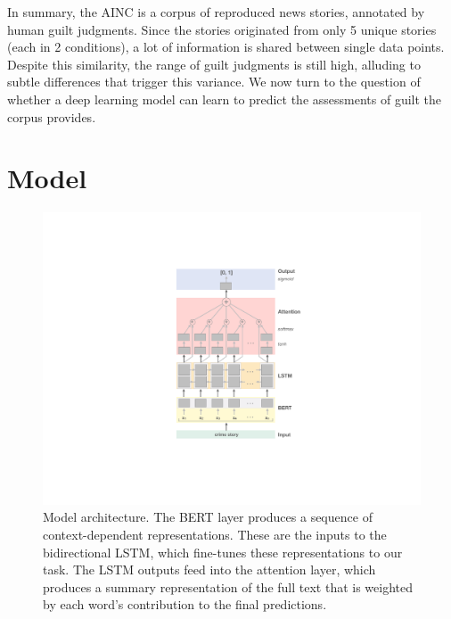 \documentclass[11pt,a4paper]{article}
\begin{document}
In summary, the AINC is a corpus of reproduced news stories, annotated by human guilt judgments. Since the stories originated from only 5 unique stories (each in 2 conditions), a lot of information is shared between single data points.  Despite this similarity, the range of guilt judgments is still high, alluding to subtle differences that trigger this variance. We now turn to the question of whether a deep learning model can learn to predict the assessments of guilt the corpus provides.



\section{Model}\label{model-architecture}

\begin{figure}[th]
  \includegraphics[width=1\linewidth]{graphs/model.pdf}
  \caption{Model architecture. The BERT layer produces
    a sequence of context-dependent representations. These
    are the inputs to the bidirectional LSTM, which
    fine-tunes these representations to our task.
    The LSTM outputs feed into the attention layer,
    which produces a summary representation of the full
    text that is weighted by each word's contribution
    to the final predictions.}
  \label{fig:model}
\end{figure}
\end{document}
